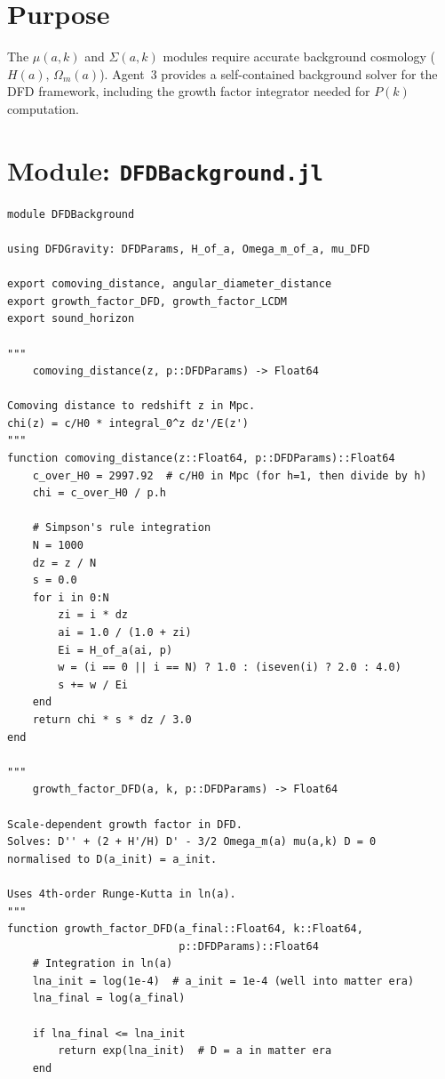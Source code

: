 \documentclass[11pt,a4paper]{article}
\begin{document}
\section{Purpose}

The $\mu(a,k)$ and $\Sigma(a,k)$ modules require accurate background cosmology ($H(a)$, $\Omega_m(a)$). Agent~3 provides a self-contained background solver for the DFD framework, including the growth factor integrator needed for $P(k)$ computation.

\section{Module: \texttt{DFDBackground.jl}}

\begin{lstlisting}[caption={DFDBackground.jl --- Background cosmology and growth factor}]
module DFDBackground

using DFDGravity: DFDParams, H_of_a, Omega_m_of_a, mu_DFD

export comoving_distance, angular_diameter_distance
export growth_factor_DFD, growth_factor_LCDM
export sound_horizon

"""
    comoving_distance(z, p::DFDParams) -> Float64

Comoving distance to redshift z in Mpc.
chi(z) = c/H0 * integral_0^z dz'/E(z')
"""
function comoving_distance(z::Float64, p::DFDParams)::Float64
    c_over_H0 = 2997.92  # c/H0 in Mpc (for h=1, then divide by h)
    chi = c_over_H0 / p.h

    # Simpson's rule integration
    N = 1000
    dz = z / N
    s = 0.0
    for i in 0:N
        zi = i * dz
        ai = 1.0 / (1.0 + zi)
        Ei = H_of_a(ai, p)
        w = (i == 0 || i == N) ? 1.0 : (iseven(i) ? 2.0 : 4.0)
        s += w / Ei
    end
    return chi * s * dz / 3.0
end

"""
    growth_factor_DFD(a, k, p::DFDParams) -> Float64

Scale-dependent growth factor in DFD.
Solves: D'' + (2 + H'/H) D' - 3/2 Omega_m(a) mu(a,k) D = 0
normalised to D(a_init) = a_init.

Uses 4th-order Runge-Kutta in ln(a).
"""
function growth_factor_DFD(a_final::Float64, k::Float64,
                           p::DFDParams)::Float64
    # Integration in ln(a)
    lna_init = log(1e-4)  # a_init = 1e-4 (well into matter era)
    lna_final = log(a_final)

    if lna_final <= lna_init
        return exp(lna_init)  # D = a in matter era
    end


\end{lstlisting}
\end{document}
